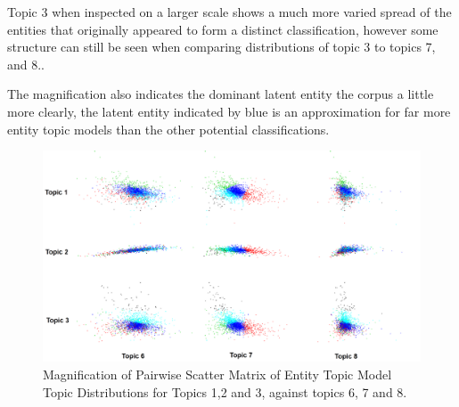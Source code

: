 \documentclass[10pt]{report}
\begin{document}
Topic 3 when inspected on a larger scale shows a much more varied spread of the entities that originally appeared to form a distinct classification, however some structure can still be seen when comparing distributions of topic 3 to topics 7, and 8..

The magnification also indicates the dominant latent entity the corpus a little more clearly, the latent entity indicated by blue is an approximation for far more entity topic models than the other potential classifications. 
\begin{figure}[h!]
  \centering
  \includegraphics[scale=0.14]{hp_full_le_clusters_zoom}
\caption{Magnification of Pairwise Scatter Matrix of Entity Topic Model Topic Distributions for Topics 1,2 and 3, against topics 6, 7 and 8.\label{fig:hp_le_cluster_zoom}}
\end{figure}

\clearpage
\end{document}
